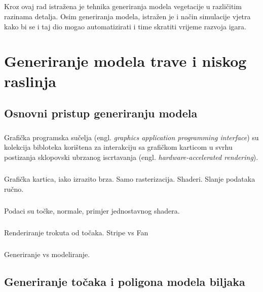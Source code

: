 \documentclass[times, utf8, diplomski]{fer}
\begin{document}
\paragraph{}
Kroz ovaj rad istražena je tehnika generiranja modela vegetacije u različitim razinama 
detalja. Osim generiranja modela, istražen je i način simulacije vjetra kako bi se i taj dio 
mogao automatizirati i time skratiti vrijeme razvoja igara.


\chapter{Generiranje modela trave i niskog raslinja}
\section{Osnovni pristup generiranju modela}
\paragraph{}
Grafička programska sučelja (engl. \textit{graphics application programming interface}) su 
kolekcija bibloteka korištena za interakciju sa grafičkom karticom u svrhu postizanja
sklopovski ubrzanog iscrtavanja (engl. \textit{hardware-accelerated rendering}).

\paragraph{}
Grafička kartica, iako izrazito brza. Samo rasterizacija. Shaderi. Slanje podataka ručno.

\paragraph{}
Podaci su točke, normale, primjer jednostavnog shadera.

\paragraph{}
Renderiranje trokuta od točaka. Stripe vs Fan

\paragraph{}
Generiranje vs modeliranje.

\section{Generiranje točaka i poligona modela biljaka}
\end{document}

